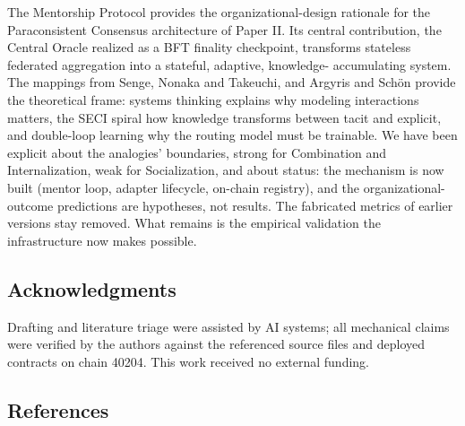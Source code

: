 The Mentorship Protocol provides the organizational-design rationale for
the Paraconsistent Consensus architecture of Paper II. Its central
contribution, the Central Oracle realized as a BFT finality checkpoint,
transforms stateless federated aggregation into a stateful, adaptive,
knowledge- accumulating system. The mappings from Senge, Nonaka and
Takeuchi, and Argyris and Schön provide the theoretical frame: systems
thinking explains why modeling interactions matters, the SECI spiral how
knowledge transforms between tacit and explicit, and double-loop
learning why the routing model must be trainable. We have been explicit
about the analogies' boundaries, strong for Combination and
Internalization, weak for Socialization, and about status: the mechanism
is now built (mentor loop, adapter lifecycle, on-chain registry), and
the organizational-outcome predictions are hypotheses, not results. The
fabricated metrics of earlier versions stay removed. What remains is the
empirical validation the infrastructure now makes possible.

\subsection{Acknowledgments}\label{acknowledgments}

Drafting and literature triage were assisted by AI systems; all
mechanical claims were verified by the authors against the referenced
source files and deployed contracts on chain 40204. This work received
no external funding.

\subsection{References}\label{references}

